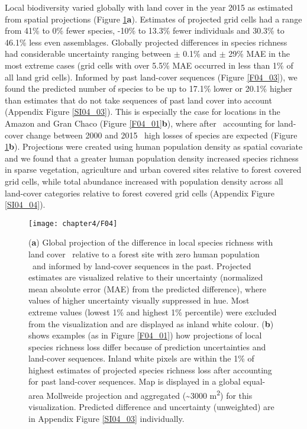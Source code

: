 Local biodiversity varied globally with land cover in the year 2015 as estimated from spatial projections (Figure \ref{F04_04}\textbf{a}). Estimates of projected grid cells had a range from 41\% to 0\% fewer species, -10\% to 13.3\% fewer individuals and 30.3\% to 46.1\% less even assemblages. Globally projected differences in species richness had considerable uncertainty ranging between $\pm$ 0.1\% and $\pm$ 29\% MAE in the most extreme cases (grid cells with over 5.5\% MAE occurred in less than 1\% of all land grid cells). Informed by past land-cover sequences (Figure \ref{F04_03}), we found the predicted number of species to be up to 17.1\% lower or 20.1\% higher than estimates that do not take sequences of past land cover into account (Appendix Figure \ref{SI04_03}). This is especially the case for locations in the Amazon and Gran Chaco (Figure \ref{F04_01}\textbf{b}), where after \textendash\ accounting for land-cover change between 2000 and 2015 \textendash\ high losses of species are expected (Figure \ref{F04_04}\textbf{b}). Projections were created using human population density as spatial covariate and we found that a greater human population density increased species richness in sparse vegetation, agriculture and urban covered sites relative to forest covered grid cells, while total abundance increased with population density across all land-cover categories relative to forest covered grid cells (Appendix Figure \ref{SI04_04}).

\begin{figure}[!h]
\centering
\texttt{[image: chapter4/F04]}
\caption{ (\textbf{a}) Global projection of the difference in local species richness with land cover \textendash\ relative to a forest site with zero human population \textendash\ and informed by land-cover sequences in the past. Projected estimates are visualized relative to their uncertainty (normalized mean absolute error (MAE) from the predicted difference), where values of higher uncertainty visually suppressed in hue. Most extreme values (lowest 1\% and highest 1\% percentile) were excluded from the visualization and are displayed as inland white colour. (\textbf{b}) shows examples (as in Figure \ref{F04_01}) how projections of local species richness loss differ because of prediction uncertainties and land-cover sequences. Inland white pixels are within the 1\% of highest estimates of projected species richness loss after accounting for past land-cover sequences. Map is displayed in a global equal-area Mollweide projection and aggregated (\textasciitilde 3000 m\textsuperscript{2}) for this visualization. Predicted difference and uncertainty (unweighted) are in Appendix Figure \ref{SI04_03} individually. }
\label{F04_04}
\end{figure}

